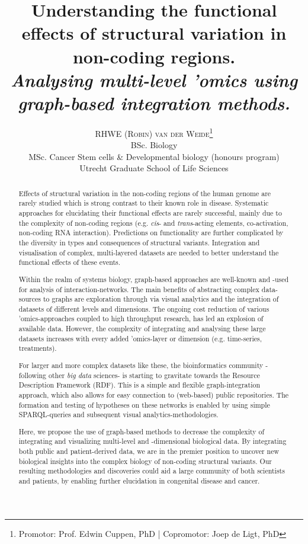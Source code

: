 \documentclass[twoside,fontsize=12pt]{article}
\title{\vspace{-15mm}\fontsize{18pt}{10pt}\normalfont\textbf{Understanding the functional effects of structural variation in non-coding regions.\\ \vspace{4 mm} {{\footnotesize \textit{Analysing multi-level 'omics using graph-based integration methods.}}}}} %
\author{
\large
\textsc {RHWE (Robin) van der Weide}\thanks{Promotor: Prof. Edwin Cuppen, PhD | Copromotor: Joep de Ligt, PhD}\\[2mm] 
\normalsize  BSc. Biology\\
\normalsize  MSc. Cancer Stem cells \& Developmental biology (honours program)\\
\normalsize  Utrecht Graduate School of Life Sciences \\
\vspace{-5mm}
}
\date{}
\renewcommand{\abstractname}{}    %
\begin{document}
\maketitle %
\thispagestyle{fancy} %

\newpage
\renewcommand{\abstractname}{\begin{center}
Summary of the research
\end{center}}    %

\begin{abstract}
\noindent
Effects of structural variation in the non-coding regions of the human genome are rarely studied which is strong contrast to their known role in disease\cite{Weischenfeldt2013}. Systematic approaches for elucidating their functional effects are rarely successful, mainly due to the complexity of non-coding regions (e.g. \textit{cis}- and \textit{trans}-acting elements, co-activation, non-coding RNA interaction). Predictions on functionality are further complicated by the diversity in types and consequences of structural variants. Integration and visualisation of complex, multi-layered datasets are needed to better understand the functional effects of these events\cite{Munoz2011}.
\medskip

\noindent 
Within the realm of systems biology, graph-based approaches are well-known and -used for analysis of interaction-networks. The main benefits of abstracting complex data-sources to graphs are exploration through via visual analytics and the integration of datasets of different levels and dimensions. The ongoing cost reduction of various 'omics-approaches coupled to high throughput research, has led an explosion of available data. However, the complexity of integrating and analysing these large datasets increases with every added 'omics-layer or dimension (e.g. time-series, treatments). 

For larger and more complex datasets like these, the bioinformatics community -following other \textit{big data} sciences- is starting to gravitate towards the Resource Description Framework (RDF). This is a simple and flexible graph-integration approach, which also allows for easy connection to (web-based) public repositories. The formation and testing of hypotheses on these  networks is enabled by using simple SPARQL-queries and subsequent visual analytics-methodologies.
\medskip

\noindent Here, we propose the use of graph-based methods to decrease the complexity of integrating and visualizing multi-level and -dimensional biological data. By integrating both public and patient-derived data, we are in the premier position to uncover new biological insights into the complex biology of non-coding structural variants. Our resulting methodologies and discoveries could aid a large community of both scientists and patients, by enabling further elucidation in congenital disease and cancer. 
\end{abstract}
\medskip
\end{document}
